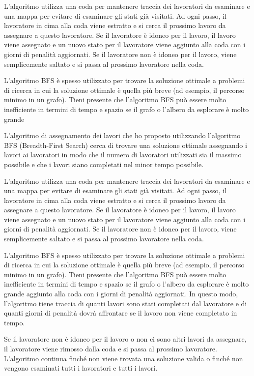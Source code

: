 L'algoritmo utilizza una coda per mantenere traccia dei lavoratori da esaminare e una mappa per evitare di esaminare gli stati già visitati. Ad ogni passo, il lavoratore in cima alla coda viene estratto e si cerca il prossimo lavoro da assegnare a questo lavoratore. Se il lavoratore è idoneo per il lavoro, il lavoro viene assegnato e un nuovo stato per il lavoratore viene aggiunto alla coda con i giorni di penalità aggiornati. Se il lavoratore non è idoneo per il lavoro, viene semplicemente saltato e si passa al prossimo lavoratore nella coda.

L'algoritmo BFS è spesso utilizzato per trovare la soluzione ottimale a problemi di ricerca in cui la soluzione ottimale è quella più breve (ad esempio, il percorso minimo in un grafo). Tieni presente che l'algoritmo BFS può essere molto inefficiente in termini di tempo e spazio se il grafo o l'albero da esplorare è molto grande

L'algoritmo di assegnamento dei lavori che ho proposto utilizzando l'algoritmo BFS (Breadth-First Search) cerca di trovare una soluzione ottimale assegnando i lavori ai lavoratori in modo che il numero di lavoratori utilizzati sia il massimo possibile e che i lavori siano completati nel minor tempo possibile.

L'algoritmo utilizza una coda per mantenere traccia dei lavoratori da esaminare e una mappa per evitare di esaminare gli stati già visitati. Ad ogni passo, il lavoratore in cima alla coda viene estratto e si cerca il prossimo lavoro da assegnare a questo lavoratore. Se il lavoratore è idoneo per il lavoro, il lavoro viene assegnato e un nuovo stato per il lavoratore viene aggiunto alla coda con i giorni di penalità aggiornati. Se il lavoratore non è idoneo per il lavoro, viene semplicemente saltato e si passa al prossimo lavoratore nella coda.

L'algoritmo BFS è spesso utilizzato per trovare la soluzione ottimale a problemi di ricerca in cui la soluzione ottimale è quella più breve (ad esempio, il percorso minimo in un grafo). Tieni presente che l'algoritmo BFS può essere molto inefficiente in termini di tempo e spazio se il grafo o l'albero da esplorare è molto grande aggiunto alla coda con i giorni di penalità aggiornati. In questo modo, l'algoritmo tiene traccia di quanti lavori sono stati completati dal lavoratore e di quanti giorni di penalità dovrà affrontare se il lavoro non viene completato in tempo.

Se il lavoratore non è idoneo per il lavoro o non ci sono altri lavori da assegnare, il lavoratore viene rimosso dalla coda e si passa al prossimo lavoratore. L'algoritmo continua finché non viene trovata una soluzione valida o finché non vengono esaminati tutti i lavoratori e tutti i lavori.

